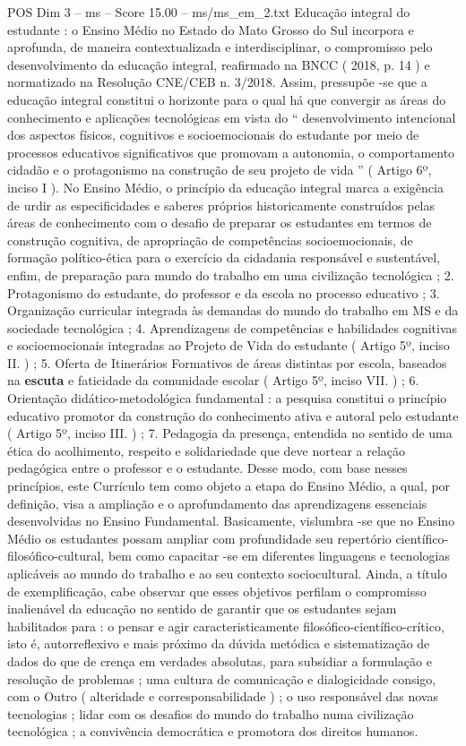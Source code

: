 \begin{textsample}{POS Dim 3 – ms – Score 15.00 – ms/ms\_em\_2.txt}
Educação integral do estudante : o Ensino Médio no Estado do Mato Grosso do Sul incorpora e aprofunda, de maneira contextualizada e interdisciplinar, o compromisso pelo desenvolvimento da educação integral, reafirmado na BNCC ( 2018, p. 14 ) e normatizado na Resolução CNE/CEB n. 3/2018.
Assim, pressupõe -se que a educação integral constitui o horizonte para o qual há que convergir as áreas do conhecimento e aplicações tecnológicas em vista do “ desenvolvimento intencional dos aspectos físicos, cognitivos e socioemocionais do estudante por meio de processos educativos significativos que promovam a autonomia, o comportamento cidadão e o protagonismo na construção de seu projeto de vida ” ( Artigo 6º, inciso I ).
No Ensino Médio, o princípio da educação integral marca a exigência de urdir as especificidades e saberes próprios historicamente construídos pelas áreas de conhecimento com o desafio de preparar os estudantes em termos de construção cognitiva, de apropriação de competências socioemocionais, de formação político-ética para o exercício da cidadania responsável e sustentável, enfim, de preparação para mundo do trabalho em uma civilização tecnológica ; 2.
Protagonismo do estudante, do professor e da escola no processo educativo ; 3.
Organização curricular integrada às demandas do mundo do trabalho em MS e da sociedade tecnológica ; 4.
Aprendizagens de competências e habilidades cognitivas e socioemocionais integradas ao Projeto de Vida do estudante ( Artigo 5º, inciso II. ) ; 5.
Oferta de Itinerários Formativos de áreas distintas por escola, baseados na \textbf{escuta} e faticidade da comunidade escolar ( Artigo 5º, inciso VII. ) ; 6.
Orientação didático-metodológica fundamental : a pesquisa constitui o princípio educativo promotor da construção do conhecimento ativa e autoral pelo estudante ( Artigo 5º, inciso III. ) ; 7.
Pedagogia da presença, entendida no sentido de uma ética do acolhimento, respeito e solidariedade que deve nortear a relação pedagógica entre o professor e o estudante.
Desse modo, com base nesses princípios, este Currículo tem como objeto a etapa do Ensino Médio, a qual, por definição, visa a ampliação e o aprofundamento das aprendizagens essenciais desenvolvidas no Ensino Fundamental.
Basicamente, vislumbra -se que no Ensino Médio os estudantes possam ampliar com profundidade seu repertório científico-filosófico-cultural, bem como capacitar -se em diferentes linguagens e tecnologias aplicáveis ao mundo do trabalho e ao seu contexto sociocultural.
Ainda, a título de exemplificação, cabe observar que esses objetivos perfilam o compromisso inalienável da educação no sentido de garantir que os estudantes sejam habilitados para : o pensar e agir caracteristicamente filosófico-científico-crítico, isto é, autorreflexivo e mais próximo da dúvida metódica e sistematização de dados do que de crença em verdades absolutas, para subsidiar a formulação e resolução de problemas ; uma cultura de comunicação e dialogicidade consigo, com o Outro ( alteridade e corresponsabilidade ) ; o uso responsável das novas tecnologias ; lidar com os desafios do mundo do trabalho numa civilização tecnológica ; a convivência democrática e promotora dos direitos humanos.

\end{textsample}
